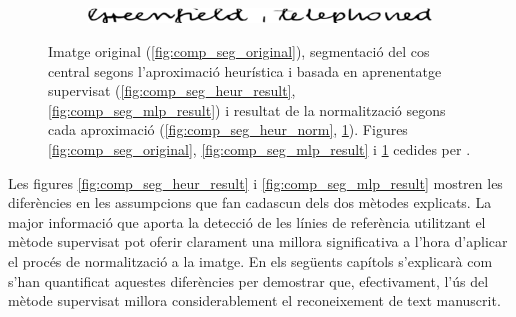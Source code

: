 \begin{figure}
\begin{subfigure}[b]{0.9\textwidth}
\centering
\includegraphics[width=\textwidth]{images/comp_seg_mlp_norm.eps}
\caption{}\label{fig:comp_seg_mlp_norm}
\end{subfigure}
\caption{Imatge original (\ref{fig:comp_seg_original}), segmentació del cos central segons l'aproximació heurística i basada en aprenentatge supervisat (\ref{fig:comp_seg_heur_result}, \ref{fig:comp_seg_mlp_result}) i resultat de la normalització segons cada aproximació (\ref{fig:comp_seg_heur_norm}, \ref{fig:comp_seg_mlp_norm}). Figures \ref{fig:comp_seg_original}, \ref{fig:comp_seg_mlp_result} i \ref{fig:comp_seg_mlp_norm} cedides per \cite{DBLP:conf/pris/Gorbe-MoyaEZB08}.}\label{fig:comp_seg}
\end{figure}

Les figures \ref{fig:comp_seg_heur_result} i \ref{fig:comp_seg_mlp_result} mostren les diferències en les assumpcions que fan cadascun dels dos mètodes explicats. La major informació que aporta la detecció de les línies de referència utilitzant el mètode supervisat pot oferir clarament una millora significativa a l'hora d'aplicar el procés de normalització a la imatge. En els següents capítols s'explicarà com s'han quantificat aquestes diferències per demostrar que, efectivament, l'ús del mètode supervisat millora considerablement el reconeixement de text manuscrit.